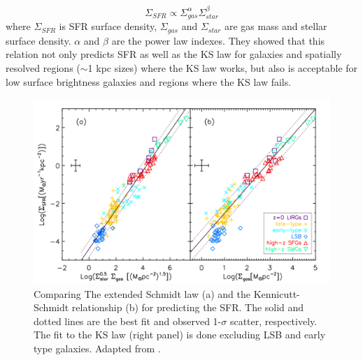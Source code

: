 \begin{equation}
\Sigma_{SFR} \propto \Sigma_{gas}^{\alpha} \Sigma_{star}^{\beta}
\end{equation}
where $\Sigma_{SFR}$ is SFR surface density, $\Sigma_{gas}$ and $\Sigma_{star}$ are gas mass and stellar surface density. $\alpha$ and $\beta$ are the power law indexes.  They showed that this relation not only predicts SFR as well as the KS law for galaxies and spatially resolved regions ($\sim$1 kpc sizes) where the KS law works, but also is acceptable for low surface brightness galaxies and regions where the KS law fails.

\begin{figure}[h]
\label{fig:duste}
\centering
\includegraphics[width=16cm]{../image_intro/schmidtvsextended}
\caption{Comparing The extended Schmidt law (a) and the Kennicutt-Schmidt relationship (b) for predicting the SFR. The solid and dotted lines are the best fit and observed 1-$\sigma$ scatter, respectively. The fit to the KS law (right panel) is done excluding LSB and early type galaxies. Adapted from \cite{Shi11}.}
\end{figure}


